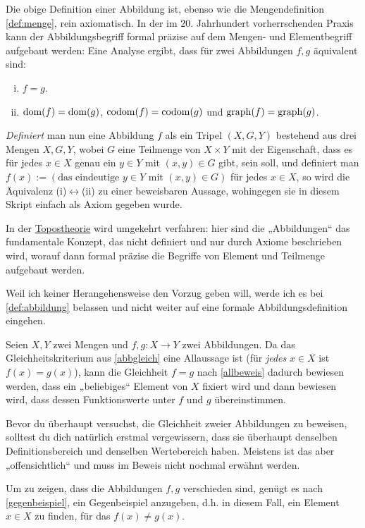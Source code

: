 \begin{vorschau}
    Die obige Definition einer Abbildung ist, ebenso wie die Mengendefinition \cref{def:menge}, rein axiomatisch. In der im 20. Jahrhundert vorherrschenden Praxis kann der Abbildungsbegriff formal präzise auf dem Mengen- und Elementbegriff aufgebaut werden: Eine Analyse ergibt, dass für zwei Abbildungen $f,g$ äquivalent sind:
    \begin{enumerate}[(i)]
        \item $f=g$.
        \item $\operatorname{dom}(f)=\operatorname{dom}(g)$, $\operatorname{codom}(f)=\operatorname{codom}(g)$ und $\operatorname{graph}(f)=\operatorname{graph}(g)$.
    \end{enumerate}
    \emph{Definiert} man nun eine Abbildung $f$ als ein Tripel $(X,G,Y)$ bestehend aus drei Mengen $X,G,Y$, wobei $G$ eine Teilmenge von $X\times Y$ mit der Eigenschaft, dass es für jedes $x\in X$ genau ein $y\in Y$ mit $(x,y)\in G$ gibt, sein soll, und definiert man $f(x):=(\text{das eindeutige $y\in Y$ mit $(x,y)\in G$})$ für jedes $x\in X$, so wird die Äquivalenz (i)$\leftrightarrow$(ii) zu einer beweisbaren Aussage, wohingegen sie in diesem Skript einfach als Axiom gegeben wurde.
    
    In der \href{https://en.wikipedia.org/wiki/Topos#Elementary_topoi_(topoi_in_logic)}{Topostheorie} wird umgekehrt verfahren: hier sind die „Abbildungen“ das fundamentale Konzept, das nicht definiert und nur durch Axiome beschrieben wird, worauf dann formal präzise die Begriffe von Element und Teilmenge aufgebaut werden.
    
    Weil ich keiner Herangehensweise den Vorzug geben will, werde ich es bei \cref{def:abbildung} belassen und nicht weiter auf eine formale Abbildungsdefinition eingehen.
\end{vorschau}


\begin{bem}
    Seien $X,Y$ zwei Mengen und $f,g:X\to Y$ zwei Abbildungen. Da das Gleichheitskriterium aus \cref{abbgleich} eine Allaussage ist (für \emph{jedes} $x\in X$ ist $f(x)=g(x)$), kann die Gleichheit $f=g$ nach \cref{allbeweis} dadurch bewiesen werden, dass ein „beliebiges“ Element von $X$ fixiert wird und dann bewiesen wird, dass dessen Funktionswerte unter $f$ und $g$ übereinstimmen.

    Bevor du überhaupt versuchst, die Gleichheit zweier Abbildungen zu beweisen, solltest du dich natürlich erstmal vergewissern, dass sie überhaupt denselben Definitionsbereich und denselben Wertebereich haben. Meistens ist das aber „offensichtlich“ und muss im Beweis nicht nochmal erwähnt werden.

    Um zu zeigen, dass die Abbildungen $f,g$ verschieden sind, genügt es nach \cref{gegenbeispiel}, ein Gegenbeispiel anzugeben, d.h. in diesem Fall, ein Element $x\in X$ zu finden, für das $f(x)\neq g(x)$.
\end{bem}


